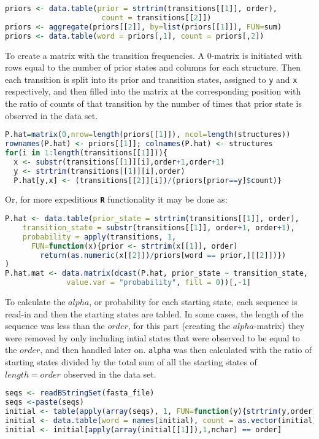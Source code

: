 \documentclass[12pt]{article}
\begin{document}
\begin{enumerate}[label = \textbf{\alph*.}]
    \newpage
    \begin{lstlisting}[language=R]
priors <- data.table(prior = strtrim(transitions[[1]], order), 
                      count = transitions[[2]])
priors <- aggregate(priors[[2]], by=list(priors[[1]]), FUN=sum)
priors <- data.table(word = priors[,1], count = priors[,2])
    \end{lstlisting}
    
    To create a matrix with the transition frequencies. A $0$-matrix is initiated with rows equal to the number of prior states and columns for each structure. Then each transition is split into its prior and transition states, assigned to \texttt{y} and \texttt{x} respectively, and then filled into the matrix at the corresponding position with the ratio of counts of that transition by the number of times that prior state is observed in the data set.
    \begin{lstlisting}[language=R]
P.hat=matrix(0,nrow=length(priors[[1]]), ncol=length(structures))
rownames(P.hat) <- priors[[1]]; colnames(P.hat) <- structures
for(i in 1:length(transitions[[1]])){
  x <- substr(transitions[[1]][i],order+1,order+1)
  y <- strtrim(transitions[[1]][i],order)
  P.hat[y,x] <- (transitions[[2]][i])/(priors[prior==y]$count)}
    \end{lstlisting}
    Or, for more expeditious \texttt{\textbf{R}} functionality it may be done as:
    \begin{lstlisting}[language=R]
P.hat <- data.table(prior_state = strtrim(transitions[[1]], order),
    transition_state = substr(transitions[[1]], order+1, order+1),
    probability = apply(transitions, 1, 
      FUN=function(x){prior <- strtrim(x[[1]], order)
        return(as.numeric(x[[2]])/priors[word == prior,][[2]])})
)
P.hat.mat <- data.matrix(dcast(P.hat, prior_state ~ transition_state, 
              value.var = "probability", fill = 0))[,-1]
    \end{lstlisting}
    
    To calculate the $alpha$, or probability for each starting state, each sequence is read-in and then the starting states are tabled. In some cases, the length of the sequence was less than the $order$, for this part (creating the $alpha$-matrix) they were removed by only including intial states that were observed to be equal to the $order$, and then handled later on. \texttt{alpha} was then calculated with the ratio of starting states divided by the total sum of all the starting states of $length = order$ observed in the data set.
    \newpage
    \begin{lstlisting}[language=R]
seqs <- readBStringSet(fasta_file)
seqs <-paste(seqs)
initial <- table(apply(array(seqs), 1, FUN=function(y){strtrim(y,order)}))
initial <- data.table(word = names(initial), count = as.vector(initial))
initial <- initial[apply(array(initial[[1]]),1,nchar) == order]


\end{lstlisting}
\end{enumerate}
\end{document}
